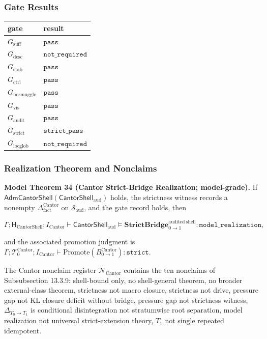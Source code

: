\documentclass[11pt]{article}
\theoremstyle{definition}
\begin{document}
\subsubsection{Gate Results}

\begin{longtable}[]{@{}ll@{}}
\toprule
gate & result\tabularnewline
\midrule
\endhead
\(G_{\mathrm{suff}}\) & \(\texttt{pass}\)\tabularnewline
\(G_{\mathrm{desc}}\) & \(\texttt{not\_required}\)\tabularnewline
\(G_{\mathrm{stab}}\) & \(\texttt{pass}\)\tabularnewline
\(G_{\mathrm{ctrl}}\) & \(\texttt{pass}\)\tabularnewline
\(G_{\mathrm{nosmuggle}}\) & \(\texttt{pass}\)\tabularnewline
\(G_{\mathrm{vis}}\) & \(\texttt{pass}\)\tabularnewline
\(G_{\mathrm{audit}}\) & \(\texttt{pass}\)\tabularnewline
\(G_{\mathrm{strict}}\) & \(\texttt{strict\_pass}\)\tabularnewline
\(G_{\mathrm{locglob}}\) & \(\texttt{not\_required}\)\tabularnewline
\bottomrule
\end{longtable}

\subsubsection{Realization Theorem and Nonclaims}

\textbf{Model Theorem 34 (Cantor Strict-Bridge Realization; model-grade).} If \(\mathsf{AdmCantorShell}(\mathsf{CantorShell}_{\mathrm{aud}})\) holds, the strictness witness records a nonempty \(\Delta_{\mathrm{fact}}^{\mathrm{Cantor}}\) on \(\mathcal S_{\mathrm{aud}}\), and the gate record holds, then

\[
\Gamma;\mathsf H_{\mathrm{CantorShell}};I_{\mathrm{Cantor}}\vdash\mathsf{CantorShell}_{\mathrm{aud}}\models\mathbf{StrictBridge}_{0\to 1}^{\mathrm{audited\ shell}}:\texttt{model\_realization},
\]

and the associated promotion judgment is \(\Gamma;\mathcal T_{0}^{\mathrm{Cantor}};I_{\mathrm{Cantor}}\vdash\mathrm{Promote}(B_{0\to 1}^{\mathrm{Cantor}}):\texttt{strict}\).

The Cantor nonclaim register \(\mathcal N_{\mathrm{Cantor}}\) contains the ten nonclaims of Subsubsection 13.3.9: shell-bound only, no shell-general theorem, no broader external-class theorem, strictness not macro closure, strictness not drive, pressure gap not KL closure deficit without bridge, pressure gap not strictness witness, \(\Delta_{T_{0}\to T_{1}}\) is conditional disintegration not stratumwise root separation, model realization not universal strict-extension theory, \(T_{1}\) not single repeated idempotent.
\end{document}
